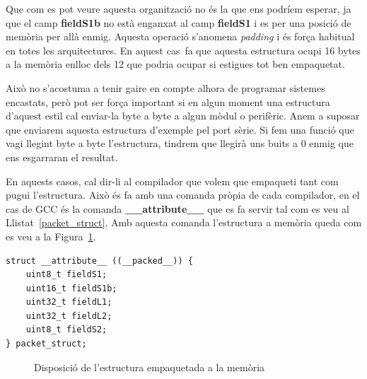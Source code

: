 Que com es pot veure aquesta organització no és la que ens podríem esperar, ja que el camp {\bf fieldS1b} no està enganxat al camp {\bf fieldS1} i es per una posició de memòria per allà enmig. Aquesta operació s'anomena {\em padding} i és força habitual en totes les arquitectures. En aquest cas fa que aquesta estructura ocupi 16 bytes a la memòria enlloc dels 12 que podria ocupar si estigues tot ben empaquetat.

Això no s'acostuma a tenir gaire en compte alhora de programar sistemes encastats, però pot ser força important si en algun moment una estructura d'aquest estil cal enviar-la byte a byte a algun mòdul o perifèric. Anem a suposar que enviarem aquesta estructura d'exemple pel port sèrie. Si fem una funció que vagi llegint byte a byte l'estructura, tindrem que llegirà uns buits a 0 enmig que ens esgarraran el resultat.

En aquests casos, cal dir-li al compilador que volem que empaqueti tant com pugui l'estructura. Això és fa amb una comanda pròpia de cada compilador, en el cas de GCC és la comanda {\bf \_\_attribute\_\_} que es fa servir tal com es veu al Llistat~\ref{packet_struct}. Amb aquesta comanda l'estructura a memòria queda com es veu  a la Figura~\ref{fig:UnpackedMemoryStructure}.


\begin{lstlisting}[style=customc,caption={Estructura d'exemple empaquetada},label=packet_struct]
struct __attribute__ ((__packed__)) {
	uint8_t fieldS1;
	uint16_t fieldS1b;
	uint32_t fieldL1;
	uint32_t fieldL2;
	uint8_t fieldS2;
} packet_struct;
\end{lstlisting}


\begin{figure}
 \centering
 \caption{Disposició de l'estructura empaquetada a la memòria}
 \label{fig:UnpackedMemoryStructure}
\end{figure}


